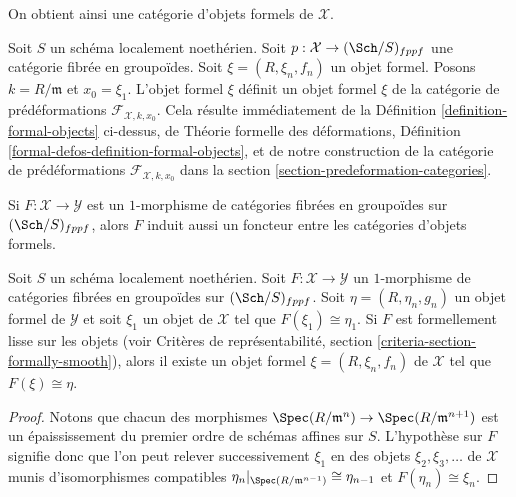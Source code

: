 \noindent
On obtient ainsi une catégorie d'objets formels de $\mathcal{X}$.

\begin{remark}
\label{remark-formal-objects-match}
Soit $S$ un schéma localement noethérien. Soit
$p : \mathcal{X} \to (\Sch/S)_{fppf}$ une catégorie fibrée en groupoïdes.
Soit $\xi = (R, \xi_n, f_n)$ un objet formel. Posons $k = R/\mathfrak m$ et
$x_0 = \xi_1$. L'objet formel $\xi$ définit un objet formel
$\xi$ de la catégorie de prédéformations $\mathcal{F}_{\mathcal{X}, k, x_0}$.
Cela résulte immédiatement de la
Définition \ref{definition-formal-objects} ci-dessus, de
Théorie formelle des déformations, Définition
\ref{formal-defos-definition-formal-objects},
et de notre construction de la catégorie de prédéformations
$\mathcal{F}_{\mathcal{X}, k, x_0}$ dans la
section \ref{section-predeformation-categories}.
\end{remark}

\noindent
Si $F : \mathcal{X} \to \mathcal{Y}$ est un $1$-morphisme de catégories fibrées
en groupoïdes sur $(\Sch/S)_{fppf}$, alors $F$ induit aussi un foncteur entre
les catégories d'objets formels.

\begin{lemma}
\label{lemma-smooth-lift-formal}
Soit $S$ un schéma localement noethérien. Soit $F : \mathcal{X} \to \mathcal{Y}$
un $1$-morphisme de catégories fibrées en groupoïdes sur $(\Sch/S)_{fppf}$.
Soit $\eta = (R, \eta_n, g_n)$ un objet formel de $\mathcal{Y}$
et soit $\xi_1$ un objet de $\mathcal{X}$ tel que $F(\xi_1) \cong \eta_1$.
Si $F$ est formellement lisse sur les objets (voir
Critères de représentabilité, section \ref{criteria-section-formally-smooth}),
alors il existe un objet formel $\xi = (R, \xi_n, f_n)$ de $\mathcal{X}$
tel que $F(\xi) \cong \eta$.
\end{lemma}

\begin{proof}
Notons que chacun des morphismes
$\Spec(R/\mathfrak m^n) \to \Spec(R/\mathfrak m^{n + 1})$ est un épaississement
du premier ordre de schémas affines sur $S$. L'hypothèse sur $F$ signifie donc
que l'on peut relever successivement $\xi_1$ en des objets $\xi_2, \xi_3, \ldots$
de $\mathcal{X}$ munis d'isomorphismes compatibles
$\eta_n|_{\Spec(R/\mathfrak m^{n - 1})} \cong \eta_{n - 1}$
et $F(\eta_n) \cong \xi_n$.
\end{proof}

